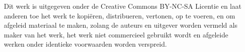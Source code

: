 Dit werk is uitgegeven onder de Creative Commons BY-NC-SA Licentie en laat anderen toe het werk te kopi\"eren, distribueren, vertonen, op te voeren, en om afgeleid materiaal te maken, zolang de auteurs en uitgever worden vermeld als maker van het werk, het werk niet commercieel gebruikt wordt en afgeleide werken onder identieke voorwaarden worden verspreid.
